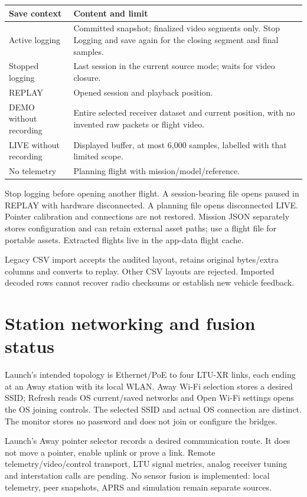 \begin{longtable}{@{}L{.29\linewidth}L{.64\linewidth}@{}}
\toprule Save context & Content and limit \\\midrule\endhead
Active logging & Committed snapshot; finalized video segments only. Stop Logging and save again for the closing segment and final samples. \\
Stopped logging & Last session in the current source mode; waits for video closure. \\
REPLAY & Opened session and playback position. \\
DEMO without recording & Entire selected receiver dataset and current position, with no invented raw packets or flight video. \\
LIVE without recording & Displayed buffer, at most 6,000 samples, labelled with that limited scope. \\
No telemetry & Planning flight with mission/model/reference. \\
\bottomrule
\end{longtable}
Stop logging before opening another flight. A session-bearing file opens paused
in REPLAY with hardware disconnected. A planning file opens disconnected LIVE.
Pointer calibration and connections are not restored. Mission JSON separately
stores configuration and can retain external asset paths; use a flight file
for portable assets. Extracted flights live in the app-data flight cache.

Legacy CSV import accepts the audited layout, retains original bytes/extra
columns and converts to replay. Other CSV layouts are rejected. Imported
decoded rows cannot recover radio checksums or establish new vehicle feedback.

\section{Station networking and fusion status}\label{sec:network}
Launch's intended topology is Ethernet/PoE to four LTU-XR links, each ending at
an Away station with its local WLAN. Away Wi-Fi selection stores a desired SSID;
Refresh reads OS current/saved networks and Open Wi-Fi settings opens the OS
joining controls. The selected SSID and actual OS connection are distinct.
The monitor stores no password and does not join or configure the bridges.

Launch's Away pointer selector records a desired communication route. It does
not move a pointer, enable uplink or prove a link. Remote telemetry/video/control
transport, LTU signal metrics, analog receiver tuning and interstation calls
are pending. No sensor fusion is implemented: local telemetry, peer snapshots,
APRS and simulation remain separate sources.

